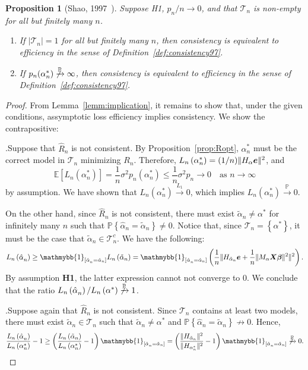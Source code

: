 \documentclass[12pt, letter paper]{article}
\newcommand{\1}{\mathmybb{1}}
\newtheorem{proposition}{Proposition}[section]
\newcommand{\0}{\emptyset}
\newcommand{\prob}{\mathbb{P}}
\newcommand{\Ep}[1]{\mathbb{E}\left[ #1 \right]}
\newcommand{\paren}[1]{\left(#1 \right)}
\newcommand{\sqbr}[1]{\left[#1 \right]}
\newcommand{\set}[1]{\left\{ #1 \right\}}
\newcommand{\norm}[1]{|\hspace{-1pt}|#1 |\hspace{-1pt}|}
\newcommand{\normsq}[1]{\norm{#1}^{2}}
\newcommand{\ind}[1]{\mathmybb{1}_{\sqbr{#1}}}
\newcommand{\Tcal}{\mathcal{T}_{n}}
\newcommand{\X}{\boldsymbol{X}}
\newcommand{\e}{\boldsymbol{e}}
\newcommand{\bbeta}{\boldsymbol{\beta}}
\newcommand{\Loss}[1]{L_{n}\paren{#1}}
\newcommand{\alphahat}[1]{\hat{\alpha}^{#1}}
\newcommand{\alphatilde}{\tilde{\alpha}}
\begin{document}
\begin{proposition}[Shao, 1997~\cite{shao_1997}]
    Suppose H1, \(p_{n}/n\to 0\), and that \(\Tcal\) is non-empty for all but finitely many \(n\).
    \begin{enumerate}
        \item If \(|\Tcal|=1\) for all but finitely many \(n\), then consistency is equivalent to efficiency in the sense of Definition~\ref{def:consistency97}.
        \item If \(p_{n}(\alpha^{*}_{n})\not\xrightarrow{\prob}\infty\), then consistency is equivalent to efficiency in the sense of Definition~\ref{def:consistency97}.
    \end{enumerate}
\end{proposition}
\begin{proof}
    From Lemma~\ref{lemm:implication}, it remains to show that, under the given conditions, assymptotic loss efficiency implies consistency. We show the contrapositive:

    .\quad Suppose that \(\hat{R}_{n}\) is not consistent. By Proposition~\ref{prop:Ropt}, \(\alpha^{*}_{n}\) must be the correct model in \(\Tcal\) minimizing \(R_{n}\). Therefore, \(\Loss{\alpha^{*}_{n}} = (1/n)\normsq{H_{\alpha}\e}\), and
    \[\Ep{\Loss{\alpha^{*}_{n}}} = \frac{1}{n}\sigma^{2}p_{n}(\alpha^{*}_{n})\leq \frac{1}{n}\sigma^{2}p_{n}\to 0 \quad\text{as }n\to\infty\]
    by assumption. We have shown that \(\Loss{\alpha^{*}_{n}}\xrightarrow{L_{1}} 0\), which implies \(\Loss{\alpha^{*}_{n}}\xrightarrow{\prob} 0\).

    On the other hand, since \(\hat{R}_{n}\) is not consistent, there must exist \(\alphatilde_{n}\neq\alpha^{*}\) for infinitely many \(n\) such that \(\prob\set{\alphahat{}_{n} = \alphatilde_{n}} \neq 0\). Notice that, since \(\Tcal=\set{\alpha^{*}}\), it must be the case that \(\alphatilde_{n}\in\Tcal^{c}\). We have the following:
    \[\Loss{\alphahat{}_{n}}\geq \ind{\alphahat{}_{n} = \alphatilde_{n}}\Loss{\alphatilde_{n}} = \ind{\alphahat{}_{n} = \alphatilde_{n}}\paren{\frac{1}{n}\normsq{H_{\alphatilde_{n}}\e + \frac{1}{n}\normsq{M_{\alpha}\X\bbeta}}}.\]
    By assumption \textbf{H1}, the latter expression cannot not converge to 0. We conclude that the ratio \(\Loss{\alphahat{}_{n}}/\Loss{\alpha^{*}}\not\xrightarrow{\prob} 1\).

    .\quad Suppose again that \(\hat{R}_{n}\) is not consistent. Since \(\Tcal\) contains at least two models, there must exist \(\alphatilde_{n}\in\Tcal\) such that \(\alphatilde_{n}\neq \alpha^{*}\) and \(\prob\set{\alphahat{}_{n} = \alphatilde_{n}}\not\to 0\). Hence,
    \[\frac{\Loss{\alphahat{}_{n}}}{\Loss{\alpha^{*}_{n}}} - 1 \geq \paren{\frac{\Loss{\alphatilde{}_{n}}}{\Loss{\alpha^{*}_{n}}} - 1}\ind{\alphahat{}_{n} = \alphatilde_{n}} = \paren{\frac{\normsq{H_{\alphatilde_{n}}}}{\normsq{H_{\alpha^{*}_{n}}}} - 1}\ind{\alphahat{}_{n} = \alphatilde_{n}}\not\xrightarrow{\prob}0.\]
\end{proof}
\end{document}
